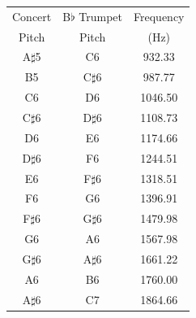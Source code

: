 \documentclass[10pt]{exam}
\begin{document}
\begin{multicols}{3}
    \begin{tabular}{ccc}
      Concert & B$\flat$ Trumpet & Frequency \\
      Pitch   &  Pitch & (Hz) \\
      \hline\hline
      A$\sharp$5 & C6 & 932.33 \\
      B5 & C$\sharp$6 & 987.77 \\
      C6 & D6 & 1046.50 \\
      C$\sharp$6 & D$\sharp$6 & 1108.73 \\
      D6 & E6 & 1174.66 \\
      D$\sharp$6 & F6 & 1244.51 \\
      E6 & F$\sharp$6 & 1318.51 \\
      F6 & G6 & 1396.91 \\
      F$\sharp$6 & G$\sharp$6 & 1479.98 \\
      G6 & A6 & 1567.98 \\
      G$\sharp$6 & A$\sharp$6 & 1661.22 \\
      A6 & B6 & 1760.00 \\
      \hline
      A$\sharp$6 & C7 & 1864.66 \\
      \hline
    \end{tabular}
    
  \end{multicols}
  
\end{document}
